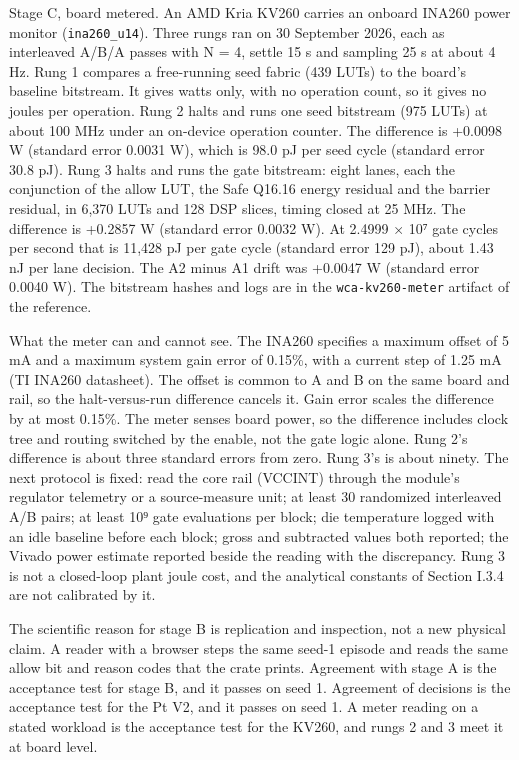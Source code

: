 \documentclass[
  10pt,
]{article}
\begin{document}
Stage C, board metered. An AMD Kria KV260 carries an onboard INA260
power monitor (\texttt{ina260\_u14}). Three rungs ran on 30 September
2026, each as interleaved A/B/A passes with N = 4, settle 15 s and
sampling 25 s at about 4 Hz. Rung 1 compares a free-running seed fabric
(439 LUTs) to the board's baseline bitstream. It gives watts only, with
no operation count, so it gives no joules per operation. Rung 2 halts
and runs one seed bitstream (975 LUTs) at about 100 MHz under an
on-device operation counter. The difference is +0.0098 W (standard error
0.0031 W), which is 98.0 pJ per seed cycle (standard error 30.8 pJ).
Rung 3 halts and runs the gate bitstream: eight lanes, each the
conjunction of the allow LUT, the Safe Q16.16 energy residual and the
barrier residual, in 6,370 LUTs and 128 DSP slices, timing closed at 25
MHz. The difference is +0.2857 W (standard error 0.0032 W). At 2.4999 ×
10⁷ gate cycles per second that is 11,428 pJ per gate cycle (standard
error 129 pJ), about 1.43 nJ per lane decision. The A2 minus A1 drift
was +0.0047 W (standard error 0.0040 W). The bitstream hashes and logs
are in the \texttt{wca-kv260-meter} artifact of the reference.

What the meter can and cannot see. The INA260 specifies a maximum offset
of 5 mA and a maximum system gain error of 0.15\%, with a current step
of 1.25 mA (TI INA260 datasheet). The offset is common to A and B on the
same board and rail, so the halt-versus-run difference cancels it. Gain
error scales the difference by at most 0.15\%. The meter senses board
power, so the difference includes clock tree and routing switched by the
enable, not the gate logic alone. Rung 2's difference is about three
standard errors from zero. Rung 3's is about ninety. The next protocol
is fixed: read the core rail (VCCINT) through the module's regulator
telemetry or a source-measure unit; at least 30 randomized interleaved
A/B pairs; at least 10⁹ gate evaluations per block; die temperature
logged with an idle baseline before each block; gross and subtracted
values both reported; the Vivado power estimate reported beside the
reading with the discrepancy. Rung 3 is not a closed-loop plant joule
cost, and the analytical constants of Section I.3.4 are not calibrated
by it.

The scientific reason for stage B is replication and inspection, not a
new physical claim. A reader with a browser steps the same seed-1
episode and reads the same allow bit and reason codes that the crate
prints. Agreement with stage A is the acceptance test for stage B, and
it passes on seed 1. Agreement of decisions is the acceptance test for
the Pt V2, and it passes on seed 1. A meter reading on a stated workload
is the acceptance test for the KV260, and rungs 2 and 3 meet it at board
level.
\end{document}
